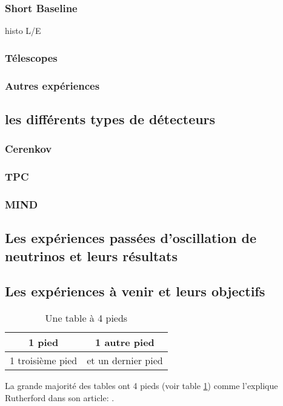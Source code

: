             \subsubsection{Short Baseline}
                histo L/E
            \subsubsection{Télescopes}
            \subsubsection{Autres expériences}
        \subsection{les différents types de détecteurs}
            \subsubsection{Cerenkov}
            \subsubsection{TPC}
            \subsubsection{MIND}
        
        \subsection{Les expériences passées d'oscillation de neutrinos et leurs résultats}
        
        \subsection{Les expériences à venir et leurs objectifs}
        
        \begin{table}[h!]
            \centering
            \begin{tabular}{|c||c|}
                \hline
                1 pied & 1 autre pied \\
                \hline
                \hline
                1 troisième pied & et un dernier pied \\
                \hline
            \end{tabular}
            \caption{Une table à 4 pieds}
            \label{Tab::table}
        \end{table}
        La grande majorité des tables ont 4 pieds (voir table \ref{Tab::table}) comme l'explique Rutherford dans son article: \cite{Rutherford}.
        
